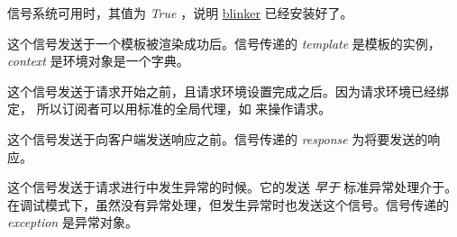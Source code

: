 \documentclass[a4paper,12pt]{sphinxmanual}
\begin{document}
\begin{fulllineitems}
\label{api:flask.signals_available}
信号系统可用时，其值为 \emph{True} ，说明 \href{http://pypi.python.org/pypi/blinker}{blinker} 已经安装好了。

\end{fulllineitems}


\begin{fulllineitems}
\label{api:flask.template_rendered}
这个信号发送于一个模板被渲染成功后。信号传递的 \emph{template} 是模板的实例，
\emph{context} 是环境对象是一个字典。

\end{fulllineitems}


\begin{fulllineitems}
\label{api:flask.request_started}
这个信号发送于请求开始之前，且请求环境设置完成之后。因为请求环境已经绑定，
所以订阅者可以用标准的全局代理，如 {\hyperref[api:flask.request]{}} 来操作请求。

\end{fulllineitems}


\begin{fulllineitems}
\label{api:flask.request_finished}
这个信号发送于向客户端发送响应之前。信号传递的 \emph{response} 为将要发送的响应。

\end{fulllineitems}


\begin{fulllineitems}
\label{api:flask.got_request_exception}
这个信号发送于请求进行中发生异常的时候。它的发送 \emph{早于} 标准异常处理介于。
在调试模式下，虽然没有异常处理，但发生异常时也发送这个信号。信号传递的
\emph{exception} 是异常对象。

\end{fulllineitems}

\end{document}
